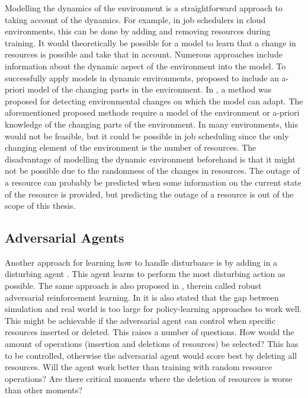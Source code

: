 Modelling the dynamics of the environment is a straightforward approach to
taking account of the dynamics. For example, in job schedulers in cloud
environments, this can be done by adding and removing resources during
training. It would theoretically be possible for a model to learn that a
change in resources is possible and take that in account. Numerous approaches
include information about the dynamic aspect of the environment into the
model. To successfully apply \rl models in dynamic environments,
 proposed to include an a-priori model of the changing
parts in the environment. In , a method was proposed for
detecting environmental changes on which the model can adapt. The
aforementioned proposed methods require a model of the environment or a-priori
knowledge of the changing parts of the environment. In many environments, this
would not be feasible, but it could be possible in job scheduling since the
only changing element of the environment is the number of resources. The
disadvantage of modelling the dynamic environment beforehand is that it might
not be possible due to the randomness of the changes in resources. The outage
of a resource can probably be predicted when some information on the current
state of the resource is provided, but predicting the outage of a resource is
out of the scope of this thesis.


\subsection{Adversarial Agents}\label{sec:adversarial}

Another approach for learning how to handle disturbance is by adding in a
disturbing agent \cite{morimoto2005}. This agent learns to perform the most
disturbing action as possible. The same approach is also proposed in
, therein called robust adversarial reinforcement learning.
In  it is also stated that the gap between simulation and
real world is too large for policy-learning approaches to work well. This
might be achievable if the adversarial agent can control when specific
resources inserted or deleted. This raises a number of questions. How would
the amount of operations (insertion and deletions of resources) be selected?
This has to be controlled, otherwise the adversarial agent would score best by
deleting all resources. Will the agent work better than training with random
resource operations? Are there critical moments where the deletion of
resources is worse than other moments?

